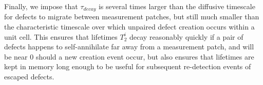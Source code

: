 \documentclass[twocolumn,superscriptaddress,aps,prb,floatfix]{revtex4-1}
\begin{document}
Finally, we impose that $\tau_{decay}$ is several times larger than the diffusive timescale for defects to migrate between measurement patches, but still much smaller than the characteristic timescale over which unpaired defect creation occurs within a unit cell.  This ensures that lifetimes $T^i_2$ decay reasonably quickly if a pair of defects happens to self-annihilate far away from a measurement patch, and will be near $0$ should a new creation event occur, but also ensures that lifetimes are kept in memory long enough to be useful for subsequent re-detection events of escaped defects.








\end{document}
